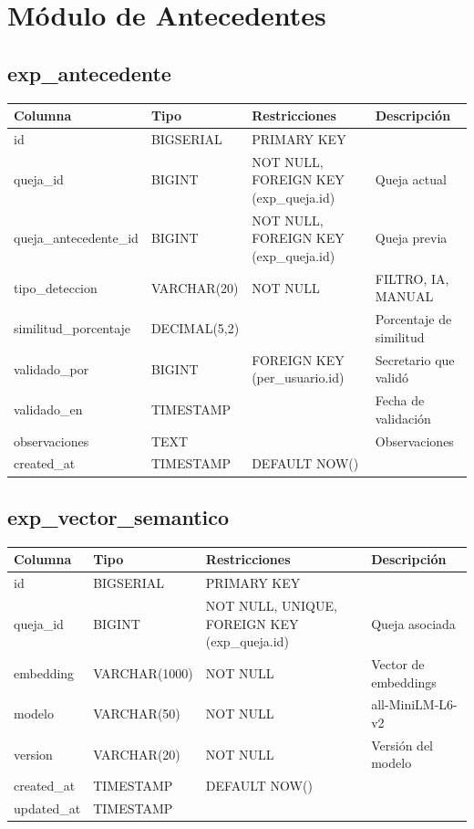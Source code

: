 \documentclass[12pt, a4paper]{article}
\begin{document}
\section{Módulo de Antecedentes}
\label{sec:antecedentes}

\subsection{exp\_antecedente}
\begin{longtable}{|p{3.5cm}|p{2.5cm}|p{3cm}|p{5cm}|}
    \hline
    \rowcolor[gray]{0.9}
    \textbf{Columna} & \textbf{Tipo} & \textbf{Restricciones} & \textbf{Descripción} \\
    \hline
    id & BIGSERIAL & PRIMARY KEY & \\
    \hline
    queja\_id & BIGINT & NOT NULL, FOREIGN KEY (exp\_queja.id) & Queja actual \\
    \hline
    queja\_antecedente\_id & BIGINT & NOT NULL, FOREIGN KEY (exp\_queja.id) & Queja previa \\
    \hline
    tipo\_deteccion & VARCHAR(20) & NOT NULL & FILTRO, IA, MANUAL \\
    \hline
    similitud\_porcentaje & DECIMAL(5,2) & & Porcentaje de similitud \\
    \hline
    validado\_por & BIGINT & FOREIGN KEY (per\_usuario.id) & Secretario que validó \\
    \hline
    validado\_en & TIMESTAMP & & Fecha de validación \\
    \hline
    observaciones & TEXT & & Observaciones \\
    \hline
    created\_at & TIMESTAMP & DEFAULT NOW() & \\
    \hline
\end{longtable}

\subsection{exp\_vector\_semantico}
\begin{longtable}{|p{3.5cm}|p{2.5cm}|p{3cm}|p{5cm}|}
    \hline
    \rowcolor[gray]{0.9}
    \textbf{Columna} & \textbf{Tipo} & \textbf{Restricciones} & \textbf{Descripción} \\
    \hline
    id & BIGSERIAL & PRIMARY KEY & \\
    \hline
    queja\_id & BIGINT & NOT NULL, UNIQUE, FOREIGN KEY (exp\_queja.id) & Queja asociada \\
    \hline
    embedding & VARCHAR(1000) & NOT NULL & Vector de embeddings \\
    \hline
    modelo & VARCHAR(50) & NOT NULL & all-MiniLM-L6-v2 \\
    \hline
    version & VARCHAR(20) & NOT NULL & Versión del modelo \\
    \hline
    created\_at & TIMESTAMP & DEFAULT NOW() & \\
    \hline
    updated\_at & TIMESTAMP & & \\
    \hline
\end{longtable}
\end{document}
